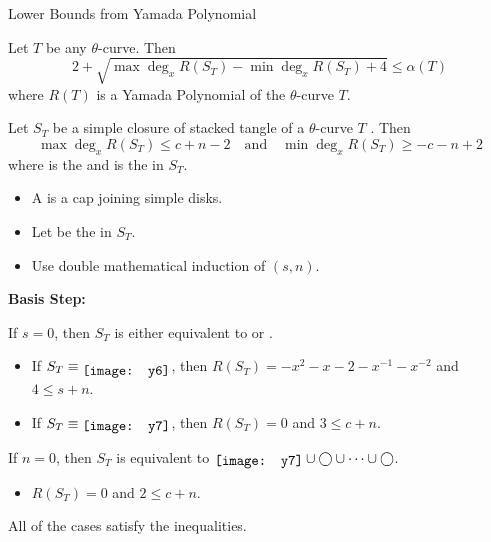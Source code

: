 \begin{frame}{Lower Bounds from Yamada Polynomial}
	\begin{thm}
	Let $T$ be any $\theta$-curve.
	Then
	\[
		2 + \sqrt{\max\deg_xR(S_T) - \min\deg_xR(S_T) + 4} \le \alpha(T)
	\]
	where $R(T)$ is a Yamada Polynomial of the $\theta$-curve $T$.
	\end{thm}	
\end{frame}


\begin{frame}
	\begin{prop}
		Let $S_T$ be a simple closure of stacked tangle of a $\theta$-curve $T$ .
		Then
		\[
			\max\deg_xR(S_T) \le c + n -2 \quad\text{and}\quad \min\deg_xR(S_T) \ge -c -n +2
		\]
		where  is the  and  is the  in $S_T$.
	\end{prop}

	\mypf
	\begin{itemize}
		\item A  is a cap joining simple disks.
		\item Let  be the  in $S_T$.
		\item Use double mathematical induction of $(s,n)$.
	\end{itemize}
\end{frame}


\begin{frame}
	\textbf{Basis Step:}

		If $s=0$, then $S_T$ is either equivalent to \raisebox{-3pt}{\texttt{[image: y6]}} or \raisebox{-1.5pt}{\texttt{[image: y7]}}.
		\begin{itemize}
			\item If $S_T\equiv \raisebox{-3pt}{\texttt{[image: y6]}}$, then $R(S_T)=-x^2 - x -2 - x^{-1} - x^{-2}$ and $4\le s+n$.
			\item If $S_T\equiv \raisebox{-1.5pt}{\texttt{[image: y7]}}$, then $R(S_T)=0$ and $3\le c+n$.
		\end{itemize}
		If $n=0$, then $S_T$ is equivalent to $\raisebox{-1.5pt}{\texttt{[image: y7]}}\cup\bigcirc\cup\cdots\cup\bigcirc$.
		\begin{itemize}
			\item $R(S_T)=0$ and $2\le c+n$.
		\end{itemize}
	All of the cases satisfy the inequalities.

\end{frame}


